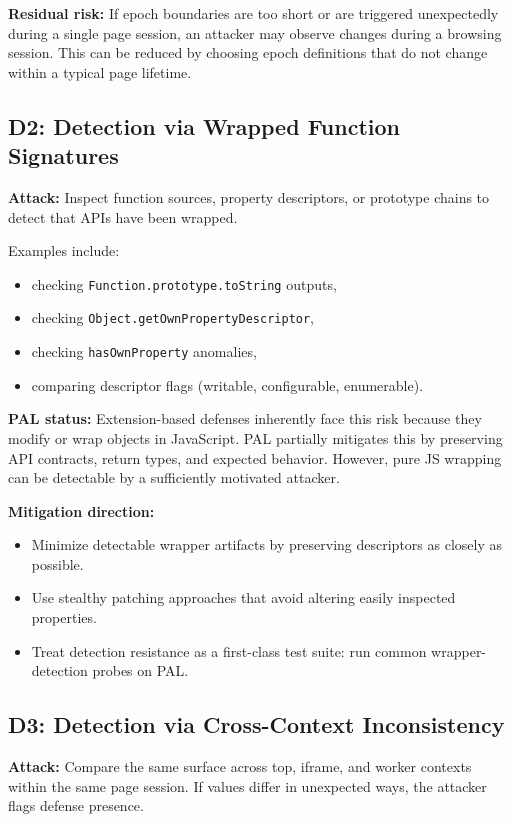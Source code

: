 \documentclass[11pt]{report}
\begin{document}
\textbf{Residual risk:} If epoch boundaries are too short or are triggered unexpectedly during a single page session, an attacker may observe changes during a browsing session. This can be reduced by choosing epoch definitions that do not change within a typical page lifetime.

\subsection{D2: Detection via Wrapped Function Signatures}

\textbf{Attack:} Inspect function sources, property descriptors, or prototype chains to detect that APIs have been wrapped.

Examples include:
\begin{itemize}
    \item checking \texttt{Function.prototype.toString} outputs,
    \item checking \texttt{Object.getOwnPropertyDescriptor},
    \item checking \texttt{hasOwnProperty} anomalies,
    \item comparing descriptor flags (writable, configurable, enumerable).
\end{itemize}

\textbf{PAL status:} Extension-based defenses inherently face this risk because they modify or wrap objects in JavaScript. PAL partially mitigates this by preserving API contracts, return types, and expected behavior. However, pure JS wrapping can be detectable by a sufficiently motivated attacker.

\textbf{Mitigation direction:}
\begin{itemize}
    \item Minimize detectable wrapper artifacts by preserving descriptors as closely as possible.
    \item Use stealthy patching approaches that avoid altering easily inspected properties.
    \item Treat detection resistance as a first-class test suite: run common wrapper-detection probes on PAL.
\end{itemize}

\subsection{D3: Detection via Cross-Context Inconsistency}

\textbf{Attack:} Compare the same surface across top, iframe, and worker contexts within the same page session. If values differ in unexpected ways, the attacker flags defense presence.
\end{document}
